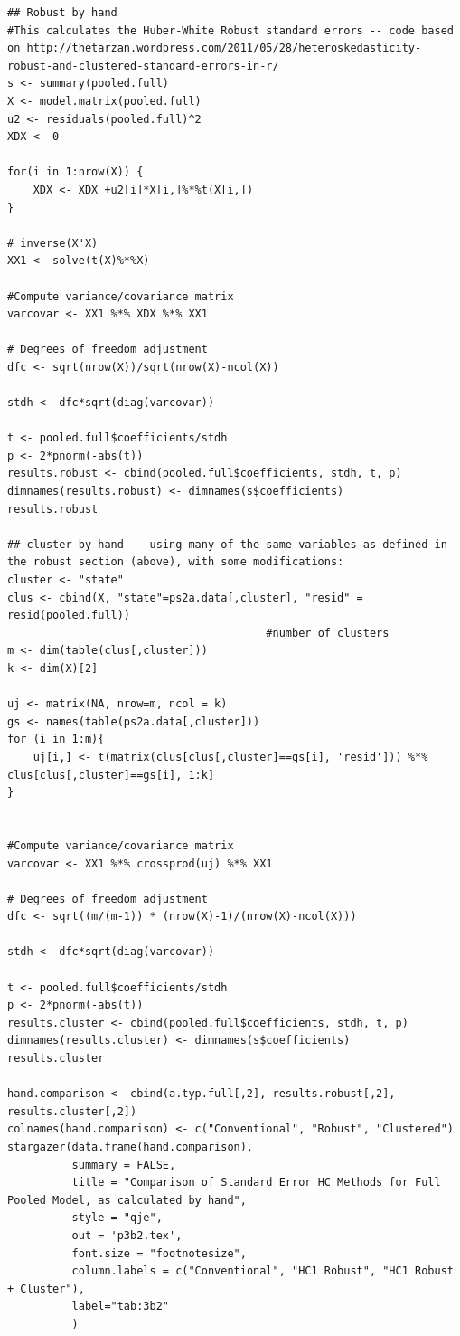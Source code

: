 \documentclass[letterpaper, 12pt]{article}
\begin{document}
\begin{lstlisting}
## Robust by hand
#This calculates the Huber-White Robust standard errors -- code based on http://thetarzan.wordpress.com/2011/05/28/heteroskedasticity-robust-and-clustered-standard-errors-in-r/
s <- summary(pooled.full)
X <- model.matrix(pooled.full)
u2 <- residuals(pooled.full)^2
XDX <- 0

for(i in 1:nrow(X)) {
    XDX <- XDX +u2[i]*X[i,]%*%t(X[i,])
}

# inverse(X'X)
XX1 <- solve(t(X)%*%X)

#Compute variance/covariance matrix
varcovar <- XX1 %*% XDX %*% XX1

# Degrees of freedom adjustment
dfc <- sqrt(nrow(X))/sqrt(nrow(X)-ncol(X))

stdh <- dfc*sqrt(diag(varcovar))

t <- pooled.full$coefficients/stdh
p <- 2*pnorm(-abs(t))
results.robust <- cbind(pooled.full$coefficients, stdh, t, p)
dimnames(results.robust) <- dimnames(s$coefficients)
results.robust

## cluster by hand -- using many of the same variables as defined in the robust section (above), with some modifications:
cluster <- "state"
clus <- cbind(X, "state"=ps2a.data[,cluster], "resid" = resid(pooled.full))
                                        #number of clusters
m <- dim(table(clus[,cluster]))
k <- dim(X)[2]

uj <- matrix(NA, nrow=m, ncol = k)
gs <- names(table(ps2a.data[,cluster]))
for (i in 1:m){
    uj[i,] <- t(matrix(clus[clus[,cluster]==gs[i], 'resid'])) %*% clus[clus[,cluster]==gs[i], 1:k]
}


#Compute variance/covariance matrix
varcovar <- XX1 %*% crossprod(uj) %*% XX1

# Degrees of freedom adjustment
dfc <- sqrt((m/(m-1)) * (nrow(X)-1)/(nrow(X)-ncol(X)))

stdh <- dfc*sqrt(diag(varcovar))

t <- pooled.full$coefficients/stdh
p <- 2*pnorm(-abs(t))
results.cluster <- cbind(pooled.full$coefficients, stdh, t, p)
dimnames(results.cluster) <- dimnames(s$coefficients)
results.cluster

hand.comparison <- cbind(a.typ.full[,2], results.robust[,2], results.cluster[,2])
colnames(hand.comparison) <- c("Conventional", "Robust", "Clustered")
stargazer(data.frame(hand.comparison),
          summary = FALSE,
          title = "Comparison of Standard Error HC Methods for Full Pooled Model, as calculated by hand",
          style = "qje",
          out = 'p3b2.tex',
          font.size = "footnotesize", 
          column.labels = c("Conventional", "HC1 Robust", "HC1 Robust + Cluster"),
          label="tab:3b2"
          )
\end{lstlisting}
\end{document}
